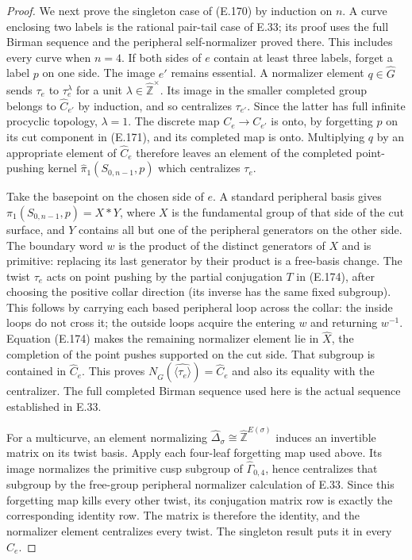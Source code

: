 \begin{proof}
We next prove the singleton case of (E.170) by induction on
$n$.  A curve enclosing two labels is the rational pair-tail
case of E.33; its proof uses the full Birman sequence and the
peripheral self-normalizer proved there.  This includes every
curve when $n=4$.  If both sides of $e$ contain at least three
labels, forget a label $p$ on one side.  The image $e'$ remains
essential.  A normalizer element $q\in\widehat G$ sends
$\tau_e$ to $\tau_e^\lambda$ for a unit
$\lambda\in\widehat{\mathbb Z}^{\times}$.  Its image in the
smaller completed group belongs to $\widehat C_{e'}$ by
induction, and so centralizes $\tau_{e'}$.  Since the latter
has full infinite procyclic topology, $\lambda=1$.
The discrete map $C_e\to C_{e'}$ is onto, by forgetting $p$
on its cut component in (E.171), and its completed map is onto.
Multiplying $q$ by an appropriate element of $\widehat C_e$
therefore leaves an element of the completed point-pushing
kernel $\widehat\pi_1(S_{0,n-1},p)$ which centralizes $\tau_e$.

Take the basepoint on the chosen side of $e$.  A standard
peripheral basis gives
$\pi_1(S_{0,n-1},p)=X*Y$, where $X$ is the fundamental group
of that side of the cut surface, and $Y$ contains all but one
of the peripheral generators on the other side.  The boundary
word $w$ is the product of the distinct generators of $X$ and
is primitive: replacing its last generator by their product
is a free-basis change.  The twist $\tau_e$ acts on point
pushing by the partial conjugation $T$ in (E.174), after
choosing the positive collar direction (its inverse has the
same fixed subgroup).  This follows by carrying each based
peripheral loop across the collar: the inside loops do not
cross it; the outside loops acquire the entering $w$ and
returning $w^{-1}$.  Equation (E.174) makes the remaining
normalizer element lie in $\widehat X$, the completion of the
point pushes supported on the cut side.  That subgroup is
contained in $\widehat C_e$.  This proves
$N_{\widehat G}(\widehat{\langle\tau_e\rangle})
=\widehat C_e$ and also its equality with the centralizer.
The full completed Birman sequence used here is the actual
sequence established in E.33.

For a multicurve, an element normalizing
$\widehat\Delta_\sigma\cong\widehat{\mathbb Z}^{E(\sigma)}$
induces an invertible matrix on its twist basis.  Apply each
four-leaf forgetting map used above.  Its image normalizes the
primitive cusp subgroup of $\widehat\Gamma_{0,4}$, hence
centralizes that subgroup by the free-group peripheral
normalizer calculation of E.33.  Since this forgetting map
kills every other twist, its conjugation matrix row is exactly
the corresponding identity row.  The matrix is therefore the
identity, and the normalizer element centralizes every twist.
The singleton result puts it in every $\widehat C_e$.


\end{proof}
